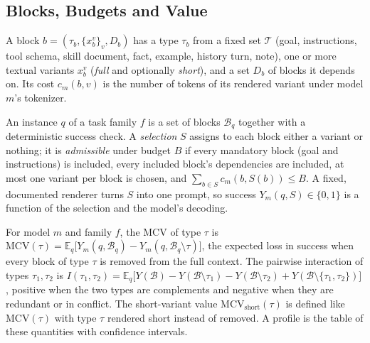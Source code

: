 
\subsection{Blocks, Budgets and Value}
\begin{definition}\label{def:block}
A block $b=(\tau_b,\{x_b^v\}_v,D_b)$ has a type $\tau_b$ from a fixed set $\mathcal{T}$ (goal, instructions, tool schema,
skill document, fact, example, history turn, note), one or more textual variants $x_b^v$ (\emph{full} and optionally
\emph{short}), and a set $D_b$ of blocks it depends on. Its cost $c_m(b,v)$ is the number of tokens of its rendered variant
under model $m$'s tokenizer.
\end{definition}

An instance $q$ of a task family $f$ is a set of blocks $\mathcal{B}_q$ together with a deterministic success check. A
\emph{selection} $S$ assigns to each block either a variant or nothing; it is \emph{admissible} under budget $B$ if every
mandatory block (goal and instructions) is included, every included block's dependencies are included, at most one
variant per block is chosen, and $\sum_{b\in S} c_m(b,S(b))\le B$. A fixed, documented renderer turns $S$ into one prompt,
so success $Y_m(q,S)\in\{0,1\}$ is a function of the selection and the model's decoding.

\begin{definition}\label{def:mcv}
For model $m$ and family $f$, the MCV of type $\tau$ is
$\mathrm{MCV}(\tau)=\mathbb{E}_q\big[Y_m(q,\mathcal{B}_q)-Y_m(q,\mathcal{B}_q\setminus\tau)\big]$,
the expected loss in success when every block of type $\tau$ is removed from the full context. The pairwise interaction
of types $\tau_1,\tau_2$ is
$I(\tau_1,\tau_2)=\mathbb{E}_q\big[Y(\mathcal{B})-Y(\mathcal{B}\setminus\tau_1)-Y(\mathcal{B}\setminus\tau_2)+
Y(\mathcal{B}\setminus\{\tau_1,\tau_2\})\big]$,
positive when the two types are complements and negative when they are redundant or in conflict. The short-variant value
$\mathrm{MCV}_{\mathrm{short}}(\tau)$ is defined like $\mathrm{MCV}(\tau)$ with type $\tau$ rendered short instead of removed.
A profile is the table of these quantities with confidence intervals.
\end{definition}

